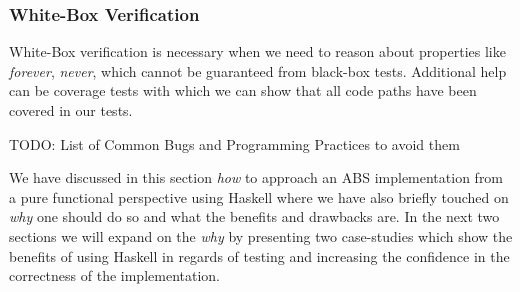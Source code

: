 \subsubsection{White-Box Verification}
White-Box verification is necessary when we need to reason about properties like \textit{forever}, \textit{never}, which cannot be guaranteed from black-box tests. Additional help can be coverage tests with which we can show that all code paths have been covered in our tests.

TODO: List of Common Bugs and Programming Practices to avoid them \cite{vipindeep_list_2005}

We have discussed in this section \textit{how} to approach an ABS implementation from a pure functional perspective using Haskell where we have also briefly touched on \textit{why} one should do so and what the benefits and drawbacks are. In the next two sections we will expand on the \textit{why} by presenting two case-studies which show the benefits of using Haskell in regards of testing and increasing the confidence in the correctness of the implementation.
